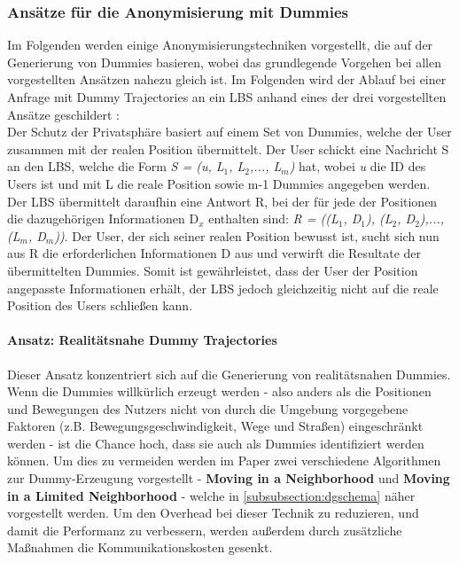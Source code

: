 \subsubsection{Ansätze für die Anonymisierung mit Dummies} \label{subsubsection:realdummy}
Im Folgenden werden einige Anonymisierungstechniken vorgestellt, die auf der Generierung von Dummies basieren, wobei das grundlegende Vorgehen bei allen vorgestellten Ansätzen nahezu gleich ist. Im Folgenden wird der Ablauf bei einer Anfrage mit Dummy Trajectories an ein LBS anhand eines der drei vorgestellten Ansätze geschildert \cite{Kido2005}:\\ 
Der Schutz der Privatsphäre basiert auf einem Set von Dummies, welche der User zusammen mit der realen Position übermittelt. Der User schickt eine Nachricht S an den LBS, welche die Form \textit{S = (u, L$_{1}$, L$_{2}$,..., L$_{m}$)} hat, wobei \textit{u} die ID des Users ist und mit L die reale Position sowie m-1 Dummies angegeben werden. Der LBS übermittelt daraufhin eine Antwort R, bei der für jede der Positionen die dazugehörigen Informationen D$_{x}$ enthalten sind: \textit{R = ((L$_{1}$, D$_{1}$), (L$_{2}$, D$_{2}$),..., (L$_{m}$, D$_{m}$))}. Der User, der sich seiner realen Position bewusst ist, sucht sich nun aus R die erforderlichen Informationen D aus und verwirft die Resultate der übermittelten Dummies. Somit ist gewährleistet, dass der User der Position angepasste Informationen erhält, der LBS jedoch gleichzeitig nicht auf die reale Position des Users schließen kann.

\paragraph{Ansatz: Realitätsnahe Dummy Trajectories \cite{Kido2005}} \label{para:simple}
Dieser Ansatz konzentriert sich auf die Generierung von realitätsnahen Dummies. Wenn die Dummies willkürlich erzeugt werden - also anders als die Positionen und Bewegungen des Nutzers nicht von durch die Umgebung vorgegebene Faktoren (z.B. Bewegungsgeschwindigkeit, Wege und Straßen) eingeschränkt werden - ist die Chance hoch, dass sie auch als Dummies identifiziert werden können. Um dies zu vermeiden werden im Paper zwei verschiedene Algorithmen zur Dummy-Erzeugung vorgestellt - \textbf{Moving in a Neighborhood} und \textbf{Moving in a Limited Neighborhood} - welche in \ref{subsubsection:dgschema} näher vorgestellt werden. Um den Overhead bei dieser Technik zu reduzieren, und damit die Performanz zu verbessern, werden außerdem durch zusätzliche Maßnahmen die Kommunikationskosten gesenkt.

